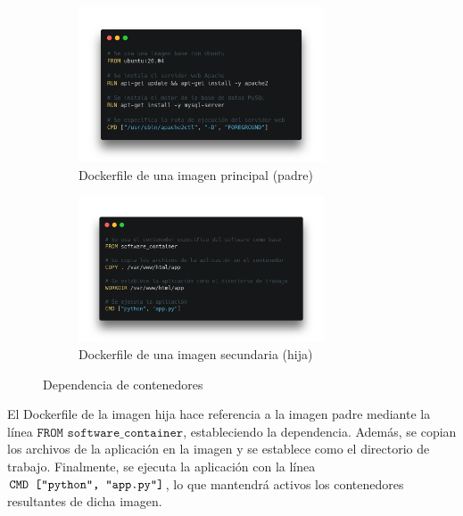                 \begin{figure}[!htbp]
                    \centering
                    
                    \begin{subfigure}[!htbp]{\textwidth}
                        \centering
                        \includegraphics[width=0.8\textwidth]{images/Contenedor A.png}
                        \caption{Dockerfile de una imagen principal (padre)}
                    \end{subfigure}
                    
                    \begin{subfigure}[!htbp]{\textwidth}
                        \centering
                        \includegraphics[width=0.8\textwidth]{images/Contenedor B.png}
                        \caption{Dockerfile de una imagen secundaria (hija)}
                    \end{subfigure}
                    
                    \caption{Dependencia de contenedores}
                    \label{fig:dependencia-contenedores}
                \end{figure}
                
                El Dockerfile de la imagen hija hace referencia a la imagen padre mediante la línea $\texttt{FROM software\_container}$, estableciendo la dependencia. Además, se copian los archivos de la aplicación en la imagen y se establece como el directorio de trabajo. Finalmente, se ejecuta la aplicación con la línea $\verb|CMD ["python", "app.py"]|$, lo que mantendrá activos los contenedores resultantes de dicha imagen.

